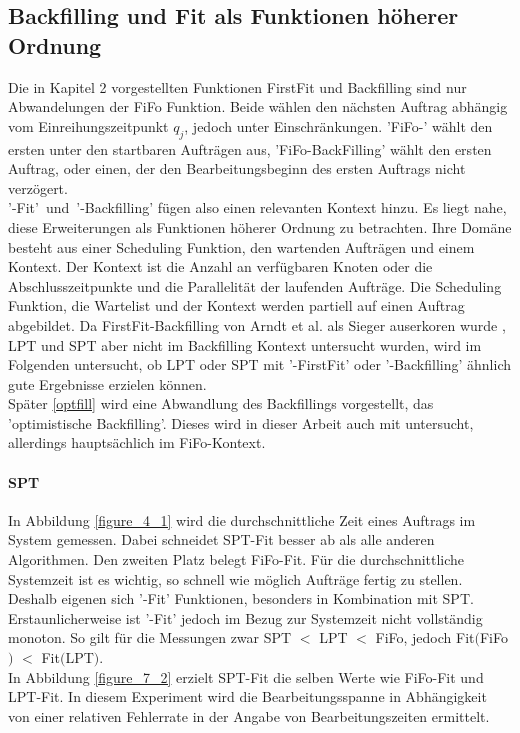 \FloatBarrier
\subsection{Backfilling und Fit als Funktionen höherer Ordnung}
\label{chap:higher-order}

Die in Kapitel 2 vorgestellten Funktionen FirstFit und Backfilling sind nur Abwandelungen der FiFo Funktion. Beide wählen den nächsten Auftrag abhängig vom Einreihungszeitpunkt $q_j$, jedoch unter Einschränkungen. 'FiFo-' wählt den ersten unter den startbaren Aufträgen aus, 'FiFo-BackFilling' wählt den ersten Auftrag, oder einen, der den Bearbeitungsbeginn des ersten Auftrags nicht verzögert.\\ \mbox{'-Fit' und '-Backfilling'} fügen also einen relevanten Kontext hinzu. Es liegt nahe, diese Erweiterungen als Funktionen höherer Ordnung zu betrachten. Ihre Domäne besteht aus einer Scheduling Funktion, den wartenden Aufträgen und einem Kontext. Der Kontext ist die Anzahl an verfügbaren Knoten oder die Abschlusszeitpunkte und die Parallelität der laufenden Aufträge. Die Scheduling Funktion, die Wartelist und der Kontext werden partiell auf einen Auftrag abgebildet. 
Da FirstFit-Backfilling von Arndt et al. als Sieger auserkoren wurde \cite[p.~10]{Arn99}, LPT und SPT aber nicht im Backfilling Kontext untersucht wurden, wird im Folgenden untersucht, ob LPT oder SPT mit '-FirstFit' oder '-Backfilling' ähnlich gute Ergebnisse erzielen können.\\
Später \ref{optfill} wird eine Abwandlung des Backfillings vorgestellt, das 'optimistische Backfilling'. Dieses wird in dieser Arbeit auch mit untersucht, allerdings hauptsächlich im FiFo-Kontext.

\paragraph{SPT}
\label{spt-higher-order}
In Abbildung \ref{figure_4_1} wird die durchschnittliche Zeit eines Auftrags im System gemessen. Dabei schneidet SPT-Fit besser ab als alle anderen Algorithmen. Den zweiten Platz belegt FiFo-Fit. Für die durchschnittliche Systemzeit ist es wichtig, so schnell wie möglich Aufträge fertig zu stellen. Deshalb eigenen sich '-Fit' Funktionen, besonders in Kombination mit SPT. Erstaunlicherweise ist '-Fit' jedoch im Bezug zur Systemzeit nicht vollständig monoton. So gilt für die Messungen zwar SPT $<$ LPT $<$ FiFo, jedoch Fit$($FiFo$)$ $<$ Fit$($LPT$)$.\\
In Abbildung \ref{figure_7_2} erzielt SPT-Fit die selben Werte wie FiFo-Fit und LPT-Fit. In diesem Experiment wird die Bearbeitungsspanne in Abhängigkeit von einer relativen Fehlerrate in der Angabe von Bearbeitungszeiten ermittelt.

